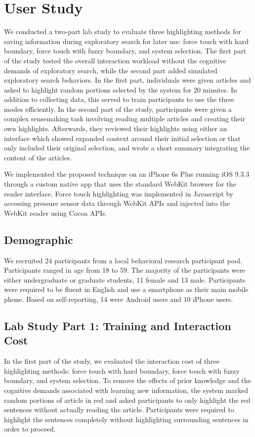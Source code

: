 \section{User Study}
We conducted a two-part lab study to evaluate three highlighting methods for saving information during exploratory search for later use: force touch with hard boundary, force touch with fuzzy boundary, and system selection. The first part of the study tested the overall interaction workload without the cognitive demands of exploratory search, while the second part added simulated exploratory search behaviors. In the first part, individuals were given articles and asked to highlight random portions selected by the system for 20 minutes. In addition to collecting data, this served to train participants to use the three modes efficiently. In the second part of the study, participants were given a complex sensemaking task involving reading multiple articles and creating their own highlights. Afterwards, they reviewed their highlights using either an interface which showed expanded context around their initial selection or that only included their original selection, and wrote a short summary integrating the content of the articles. 

We implemented the proposed technique on an iPhone 6s Plus running iOS 9.3.3 through a custom native app that uses the standard WebKit browser for the reader interface. Force touch highlighting was implemented in Javascript by accessing pressure sensor data through WebKit APIs and injected into the WebKit reader using Cocoa APIs.


\subsection{Demographic}

We recruited 24 participants from a local behavioral research participant pool. Participants ranged in age from 18 to 59. The majority of the participants were either undergraduate or graduate students, 11 female and 13 male. Participants were required to be fluent in English and use a smartphone as their main mobile phone. Based on self-reporting, 14 were Android users and 10 iPhone users. 


\subsection{Lab Study Part 1: Training and Interaction Cost}

In the first part of the study, we evaluated the interaction cost of three highlighting methods: force touch with hard boundary, force touch with fuzzy boundary, and system selection. To remove the effects of prior knowledge and the cognitive demands associated with learning new information, the system marked random portions of article in red and asked participants to only highlight the red sentences without actually reading the article. Participants were required to highlight the sentences completely without highlighting surrounding sentences in order to proceed.

